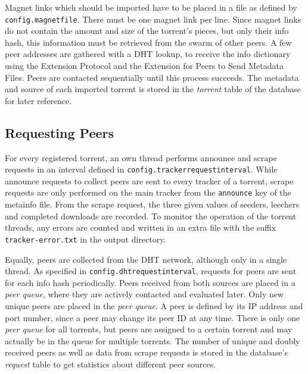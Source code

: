 \documentclass[10pt, a4paper, twoside=false, headsepline]{scrbook}
\renewcommand{\_}{\origunderscore\allowbreak}
\newcommand{\config}[1]{\texttt{config.\allowbreak #1}}
\begin{document}
Magnet links which should be imported have to be placed in a file as defined by \config{magnet\_file}. There must be one magnet link per line. Since magnet links do not contain the amount and size of the torrent's pieces, but only their info hash, this information must be retrieved from the swarm of other peers. A few peer addresses are gathered with a DHT lookup, to receive the info dictionary using the Extension Protocol and the Extension for Peers to Send Metadata Files. Peers are contacted sequentially until this process succeeds. The metadata and source of each imported torrent is stored in the \emph{torrent} table of the database for later reference.

\subsection{Requesting Peers}
\label{req}
For every registered torrent, an own thread performs announce and scrape requests in an interval defined in \config{tracker\_request\_interval}. While announce requests to collect peers are sent to every tracker of a torrent, scrape requests are only performed on the main tracker from the \texttt{announce} key of the metainfo file. From the scrape request, the three given values of seeders, leechers and completed downloads are recorded. To monitor the operation of the torrent threads, any errors are counted and written in an extra file with the suffix \texttt{\_tracker-error.txt} in the output directory.

Equally, peers are collected from the DHT network, although only in a single thread. As specified in \config{dht\_request\_interval}, requests for peers are sent for each info hash periodically. Peers received from both sources are placed in a \emph{peer queue}, where they are actively contacted and evaluated later. Only new unique peers are placed in the \emph{peer queue}. A peer is defined by its IP address and port number, since a peer may change its peer ID at any time. There is only one \emph{peer queue} for all torrents, but peers are assigned to a certain torrent and may actually be in the queue for multiple torrents. The number of unique and doubly received peers as well as data from scrape requests is stored in the database's \emph{request} table to get statistics about different peer sources.
\end{document}
